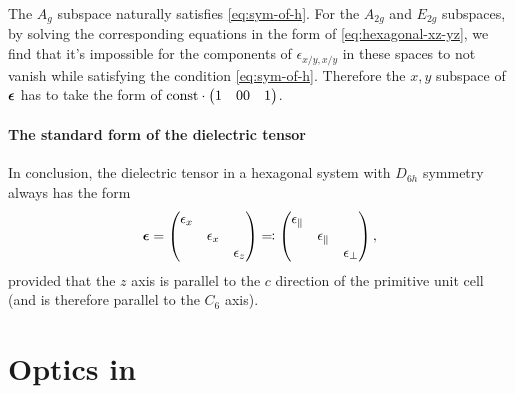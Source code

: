\documentclass[hyperref, a4paper, 12pt]{article}
\newcommand*{\const}{\mathrm{const}}
\def\\{}%
\begin{document}
The $A_g$ subspace naturally satisfies \eqref{eq:sym-of-h}.
For the $A_{2g}$ and $E_{2g}$ subspaces,
by solving the corresponding equations in the form of \eqref{eq:hexagonal-xz-yz},
we find that it's impossible for the components of $\epsilon_{x/y, x/y}$ in these spaces to not vanish while satisfying the condition \eqref{eq:sym-of-h}.
Therefore the $x,y$ subspace of $\vb*{\epsilon}$ has to take the form of $\const \cdot \pmqty{1 & 0 \\ 0 & 1}$.

\paragraph*{The standard form of the dielectric tensor}
In conclusion, the dielectric tensor in a hexagonal system with $D_{6h}$ symmetry always has the form 
\begin{equation}
    \vb*{\epsilon} = \pmqty{\dmat{\epsilon_x, \epsilon_x, \epsilon_z}}
    \eqqcolon \pmqty{\dmat{\epsilon_\parallel, \epsilon_\parallel, \epsilon_\bot}},
\end{equation}
provided that the $z$ axis is parallel to the $c$ direction of the primitive unit cell
(and is therefore parallel to the $C_6$ axis).

\section{Optics in }
\end{document}
